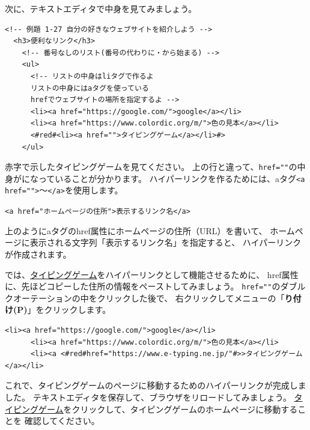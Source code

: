 次に、テキストエディタで中身を見てみましょう。
\bigskip

\begin{lstlisting}[caption=ハイパーリンク（編集前）,label=pwdtest,firstnumber=1]
  <!-- 例題 1-27 自分の好きなウェブサイトを紹介しよう -->
  <h3>便利なリンク</h3>
    <!-- 番号なしのリスト(番号の代わりに・から始まる) -->
    <ul>
      <!-- リストの中身はliタグで作るよ
      リストの中身にはaタグを使っている 
      hrefでウェブサイトの場所を指定するよ -->
      <li><a href="https://google.com/">google</a></li>
      <li><a href="https://www.colordic.org/m/">色の見本</a></li>
      <#red#<li><a href="">タイピングゲーム</a></li>#>
    </ul>
\end{lstlisting} 

\noindent%
赤字で示したタイピングゲームを見てください。
上の行と違って、\texttt{href=""}の中身がになっていることが分かります。
ハイパーリンクを作るためには、aタグ\texttt{<a href="">}～\texttt{</a>}を使用します。
\vspace{.5cm}

\texttt{<a href="ホームページの住所">表示するリンク名</a>}
\vspace{.5cm}

\noindent%
上のようにaタグのhref属性にホームページの住所（URL）を書いて、
ホームページに表示される文字列「表示するリンク名」を指定すると、
ハイパーリンクが作成されます。

では、\ul{タイピングゲーム}をハイパーリンクとして機能させるために、
href属性に、先ほどコピーした住所の情報をペーストしてみましょう。
\texttt{href=""}のダブルクオーテーションの中をクリックした後で、
右クリックしてメニューの「\textbf{り付け(P)}」をクリックします。
\vspace{0.5cm}

\begin{lstlisting}[caption=ハイパーリンク（編集後）,label=pwdtest,firstnumber=1]
      <li><a href="https://google.com/">google</a></li>
      <li><a href="https://www.colordic.org/m/">色の見本</a></li>
      <li><a <#red#href="https://www.e-typing.ne.jp/"#>>タイピングゲーム</a></li>
\end{lstlisting} 

\noindent%
これで、タイピングゲームのページに移動するためのハイパーリンクが完成しました。
テキストエディタを保存して、ブラウザをリロードしてみましょう。
\ul{タイピングゲーム}をクリックして、タイピングゲームのホームページに移動することを
確認してください。



